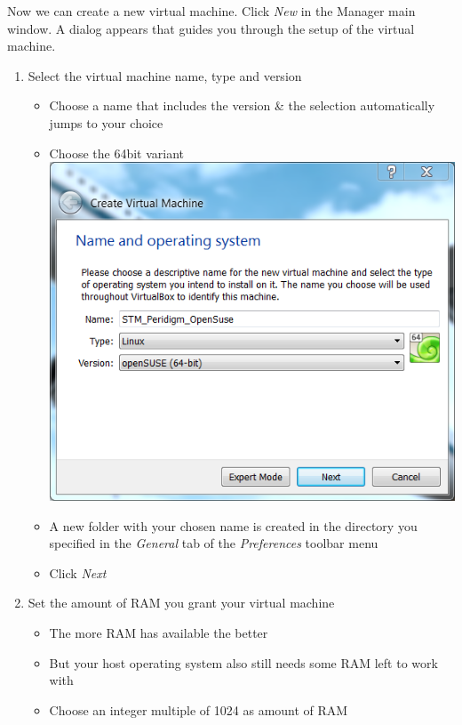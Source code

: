 Now we can create a new virtual machine. Click \textit{New} in the \marktool{\virtualboxname} Manager main window. A dialog appears that guides you through the setup of the virtual machine.

\begin{enumerate}[noitemsep]
  \item Select the virtual machine name, type and version
    \begin{itemize}
      \item Choose a name that includes the version \& the selection automatically jumps to your choice
      \item Choose the 64bit variant\\
      \includegraphics[scale=\screenshotscalefac]{Figures/VirtualBox_Create_VirtualMachine_Name_OS}
      \item A new folder with your chosen name is created in the directory you specified in the \textit{General} tab of the \textit{Preferences} toolbar menu
      \item Click \textit{Next}
    \end{itemize}
 \item Set the amount of RAM you grant your virtual machine
    \begin{itemize}
      \item The more RAM \marktool{\toolname} has available the better
      \item But your host operating system also still needs some RAM left to work with
      \item Choose an integer multiple of 1024 as amount of RAM

\end{itemize}
\end{enumerate}
